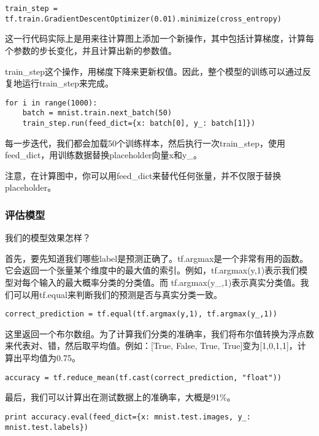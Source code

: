 \begin{lstlisting}
train_step = tf.train.GradientDescentOptimizer(0.01).minimize(cross_entropy)
\end{lstlisting}

这一行代码实际上是用来往计算图上添加一个新操作，其中包括计算梯度，计算每个参数的步长变化，并且计算出新的参数值。

train\_step这个操作，用梯度下降来更新权值。因此，整个模型的训练可以通过反复地运行train\_step来完成。

\begin{lstlisting}
for i in range(1000):
    batch = mnist.train.next_batch(50)
    train_step.run(feed_dict={x: batch[0], y_: batch[1]})
\end{lstlisting}

每一步迭代，我们都会加载50个训练样本，然后执行一次train\_step，使用feed\_dict，用训练数据替换placeholder向量x和y\_。

注意，在计算图中，你可以用feed\_dict来替代任何张量，并不仅限于替换placeholder。

\subsubsection{评估模型}

我们的模型效果怎样？

首先，要先知道我们哪些label是预测正确了。tf.argmax是一个非常有用的函数。它会返回一个张量某个维度中的最大值的索引。例如，tf.argmax(y,1)表示我们模型对每个输入的最大概率分类的分类值。而 tf.argmax(y\_,1)表示真实分类值。我们可以用tf.equal来判断我们的预测是否与真实分类一致。

\begin{lstlisting}
correct_prediction = tf.equal(tf.argmax(y,1), tf.argmax(y_,1))
\end{lstlisting}

这里返回一个布尔数组。为了计算我们分类的准确率，我们将布尔值转换为浮点数来代表对、错，然后取平均值。例如：[True, False, True, True]变为[1,0,1,1]，计算出平均值为0.75。

\begin{lstlisting}
accuracy = tf.reduce_mean(tf.cast(correct_prediction, "float"))
\end{lstlisting}

最后，我们可以计算出在测试数据上的准确率，大概是91\%。

\begin{lstlisting}
print accuracy.eval(feed_dict={x: mnist.test.images, y_: mnist.test.labels})
\end{lstlisting}


